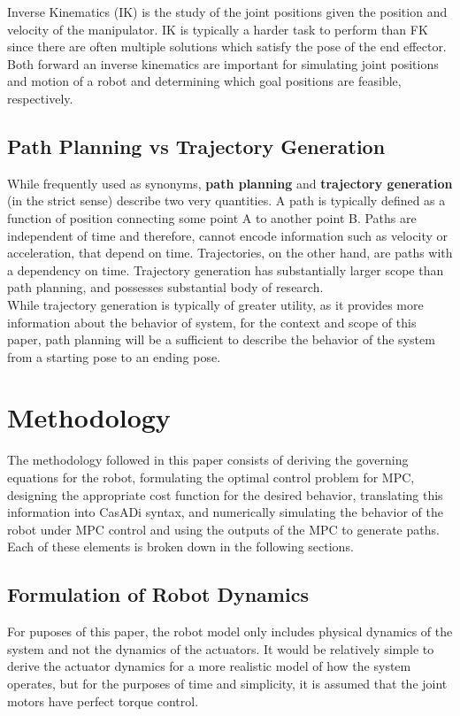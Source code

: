 \documentclass[journal]{IEEEtran}
\begin{document}
Inverse Kinematics (IK) is the study of the joint positions given the position and velocity of the manipulator. IK is typically a harder task to perform than FK since there are often multiple solutions which satisfy the pose of the end effector. \\

Both forward an inverse kinematics are important for simulating joint positions and motion of a robot and determining which goal positions are feasible, respectively.

\subsection{Path Planning vs Trajectory Generation}

While frequently used as synonyms, \textbf{path planning} and \textbf{trajectory generation} (in the strict sense) describe two very quantities. A path is typically defined as a function of position connecting some point A to another point B. Paths are independent of time and therefore, cannot encode information such as velocity or acceleration, that depend on time. Trajectories, on the other hand, are paths with a dependency on time. Trajectory generation has substantially larger scope than path planning, and possesses substantial body of research.  \\

While trajectory generation is typically of greater utility, as it provides more information about the behavior of system, for the context and scope of this paper, path planning will be a sufficient to describe the behavior of the system from a starting pose to an ending pose.

\section{Methodology}

The methodology followed in this paper consists of deriving the governing equations for the robot, formulating the optimal control problem for MPC, designing the appropriate cost function for the desired behavior, translating this information into CasADi syntax, and numerically simulating the behavior of the robot under MPC control and using the outputs of the MPC to generate paths. Each of these elements is broken down in the following sections.

\subsection{Formulation of Robot Dynamics}
For puposes of this paper, the robot model only includes physical dynamics of the system and not the dynamics of the actuators. It would be relatively simple to derive the actuator dynamics for a more realistic model of how the system operates, but for the purposes of time and simplicity, it is assumed that the joint motors have perfect torque control. \\
\end{document}

